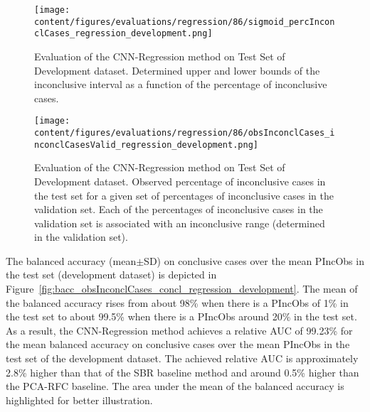 \begin{figure}[ht]
  \centering
  \texttt{[image: content/figures/evaluations/regression/86/sigmoid\_percInconclCases\_regression\_development.png]}
  \caption{Evaluation of the CNN-Regression method on Test Set of Development dataset. 
  Determined upper and lower bounds of the inconclusive interval as a function of the percentage of inconclusive cases.} 
  \label{fig:regression_percInconclCases_development}
\end{figure}


\begin{figure}[ht]
  \centering
  \texttt{[image: content/figures/evaluations/regression/86/obsInconclCases\_inconclCasesValid\_regression\_development.png]}
  \caption{Evaluation of the CNN-Regression method on Test Set of Development dataset.
  Observed percentage of inconclusive cases in the test set 
  for a given set of percentages of inconclusive cases in the validation set.
  Each of the percentages of inconclusive cases in the validation set is associated 
  with an inconclusive range (determined in the validation set).} 
  \label{fig:obsInconclCases_inconclCasesValid_regression_development}
\end{figure} 


The balanced accuracy (mean$\pm$SD) on conclusive cases over the mean PIncObs in the test set (development dataset) 
is depicted in Figure~\ref{fig:bacc_obsInconclCases_concl_regression_development}.
The mean of the balanced accuracy rises from about 98\% when there is a PIncObs of 1\% in the test set 
to about 99.5\% when there is a PIncObs around 20\% in the test set.
As a result, the CNN-Regression method achieves a relative AUC of 99.23\% for the mean balanced accuracy on conclusive cases
over the mean PIncObs in the test set of the development dataset.
The achieved relative AUC is approximately 2.8\% higher than that of the SBR baseline method 
and around 0.5\% higher than the PCA-RFC baseline.
The area under the mean of the balanced accuracy is highlighted for better illustration.



